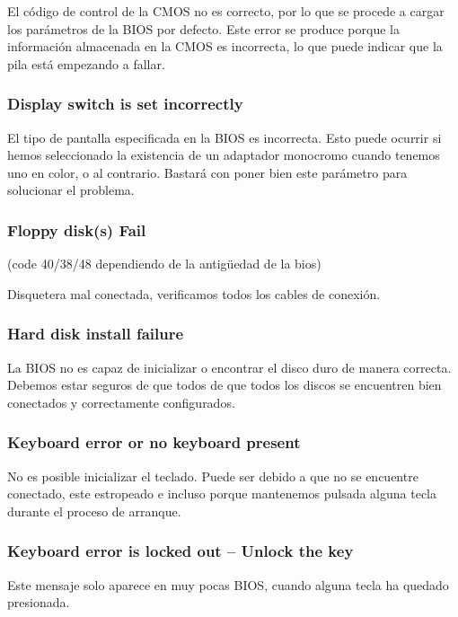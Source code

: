 		El código de control de la CMOS no es correcto, por lo que se
		procede a cargar los parámetros de la BIOS por defecto. Este error
		se produce porque la información almacenada en la CMOS es
		incorrecta, lo que puede indicar que la pila está empezando a
		fallar.

		\subsubsection{Display switch is set incorrectly}

		El tipo de pantalla especificada en la BIOS es incorrecta. Esto puede
		ocurrir si hemos seleccionado la existencia de un adaptador monocromo
		cuando tenemos uno en color, o al contrario. Bastará con poner bien
		este parámetro para solucionar el problema.

		\subsubsection{Floppy disk(s) Fail} 
		
		(code 40/38/48 dependiendo de la antigüedad de la bios)

		Disquetera mal conectada, verificamos todos los cables de conexión.

		\subsubsection{Hard disk install failure}

		La BIOS no es capaz de inicializar o encontrar el disco duro de
		manera correcta. Debemos estar seguros de que todos de que todos
		los discos se encuentren bien conectados y correctamente
		configurados.

		\subsubsection{Keyboard error or no keyboard present}

		No es posible inicializar el teclado. Puede ser debido a que no se
		encuentre conectado, este estropeado e incluso porque mantenemos
		pulsada alguna tecla durante el proceso de arranque.

		\subsubsection{Keyboard error is locked out – Unlock the key}

		Este mensaje solo aparece en muy pocas BIOS, cuando alguna tecla ha
		quedado presionada. 

